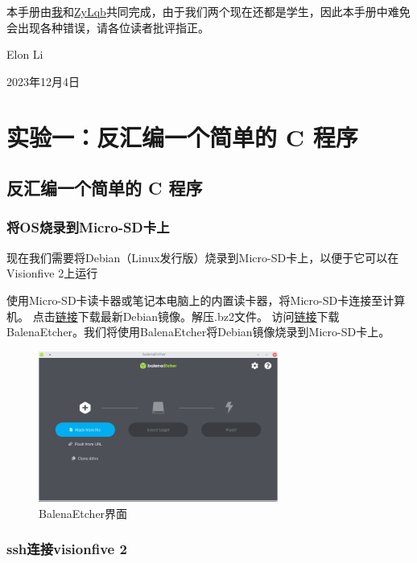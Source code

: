 \documentclass[lang=cn,10pt]{elegantbook}
\begin{document}
本手册由\href{https://github.com/Elonisme}{我}和\href{https://github.com/ZyLqb}{ZyLqb}共同完成，由于我们两个现在还都是学生，因此本手册中难免会出现各种错误，请各位读者批评指正。

\hfill Elon Li

\hfill \hspace{2em} 2023年12月4日


\tableofcontents

\mainmatter

\chapter{实验一：反汇编一个简单的 C 程序}

\section{反汇编一个简单的 C 程序}
\subsection{将OS烧录到Micro-SD卡上}
现在我们需要将Debian（Linux发行版）烧录到Micro-SD卡上，以便于它可以在Visionfive 2上运行

使用Micro-SD卡读卡器或笔记本电脑上的内置读卡器，将Micro-SD卡连接至计算机。
点击\href{https://debian.starfivetech.com/}{链接}下载最新Debian镜像。解压.bz2文件。 访问\href{https://www.balena.io/etcher/}{链接}下载BalenaEtcher。我们将使用BalenaEtcher将Debian镜像烧录到Micro-SD卡上。


\begin{figure}[htbp]
  \centering
  \includegraphics[width=0.7\textwidth]{image/image-20231015121217662.png}
  \caption{BalenaEtcher界面}
\end{figure}


\subsection{ssh连接visionfive 2}
\end{document}
